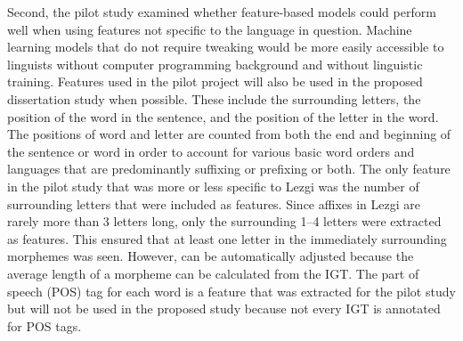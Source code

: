Second, the pilot study examined whether feature-based models could perform well when using features not specific to the language in question. Machine learning models that do not require tweaking would be more easily accessible to linguists without computer programming background and without linguistic training. Features used in the pilot project will also be used in the proposed dissertation study when possible. These include the surrounding letters, the position of the word in the sentence, and the position of the letter in the word. The positions of word and letter are counted from both the end and beginning of the sentence or word in order to account for various basic word orders and languages that are predominantly suffixing or prefixing or both. The only feature in the pilot study that was more or less specific to Lezgi was the number of surrounding letters that were included as features. Since affixes in Lezgi are rarely more than 3 letters long, only the surrounding 1--4 letters were extracted as features. This ensured that at least one letter in the immediately surrounding morphemes was seen. However, can be automatically adjusted because the average length of a morpheme can be calculated from the IGT. 
The part of speech (POS) tag for each word is a feature that was extracted for the pilot study but will not be used in the proposed study because not every IGT is annotated for POS tags. 


